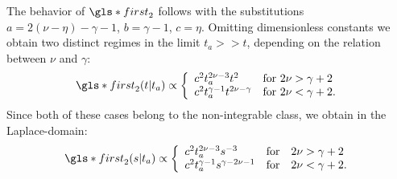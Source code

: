 The behavior of $\gls*{first}_{2}$ follows with the substitutions $a= 2(\nu-\eta)-\gamma-1$, $b=\gamma-1$, $c=\eta$. Omitting dimensionless constants we obtain 
two distinct regimes in the limit $t_a>>t$, depending on the relation between $\nu$ and $\gamma$:
\begin{equation}
\gls*{first}_{2}(t|t_a) \propto 
\left\{ \begin{array}{l l}
c^2 t_a^{2\nu-3} t^2 & \text{for } 2\nu> \gamma+2\\
c^2 t_a^{\gamma-1} t^{2\nu-\gamma}   & \text{for } 2\nu < \gamma+2 .
\end{array} \right. 
\end{equation}
Since both of these cases belong to the non-integrable class, we obtain in the Laplace-domain:
\begin{equation}
\gls*{first}_{2}(s|t_a) \propto   \left\{ \begin{array}{l l l}
c^2 t_a^{2\nu-3} s^{-3} & \mathrm{for} & 2\nu> \gamma+2\\
c^2  t_a^{\gamma-1} s^{\gamma-2\nu-1} & \mathrm{for} & 2\nu < \gamma+2 .
\end{array} \right.
\end{equation}

